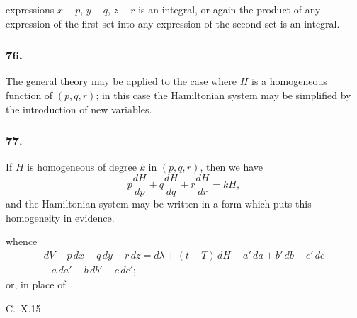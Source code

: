 \documentclass[12pt,a4paper]{article}
\theoremstyle{plain}
\begin{document}
expressions $x - p$, $y - q$, $z - r$ is an integral, or again the product of any expression of the first set into any expression of the second set is an integral.

\subsubsection*{76.}

The general theory may be applied to the case where $H$ is a homogeneous function of $(p, q, r)$; in this case the Hamiltonian system may be simplified by the introduction of new variables.

\subsubsection*{77.}

If $H$ is homogeneous of degree $k$ in $(p, q, r)$, then we have
\[
p\frac{dH}{dp} + q\frac{dH}{dq} + r\frac{dH}{dr} = kH,
\]
and the Hamiltonian system may be written in a form which puts this homogeneity in evidence.

\newpage
\setcounter{page}{150}

whence
\begin{multline}
dV - p\,dx - q\,dy - r\,dz = d\lambda + (t - T)\,dH + a'\,da + b'\,db + c'\,dc \\
- a\,da' - b\,db' - c\,dc';
\end{multline}
or, in place of

\medskip\noindent\textsc{C.~X.}\hfill 15
\end{document}
